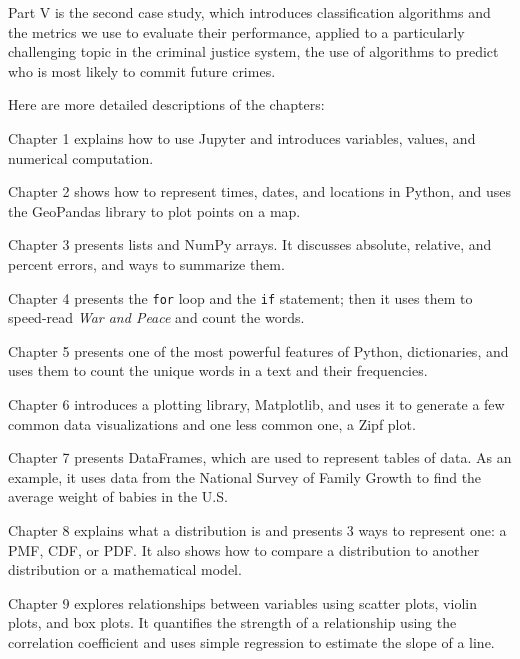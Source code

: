 Part V is the second case study, which introduces classification algorithms and the metrics we use to evaluate their performance, applied to a particularly challenging topic in the criminal justice system, the use of algorithms to predict who is most likely to commit future crimes.

Here are more detailed descriptions of the chapters:

\begin{description}

\item Chapter 1 explains how to use
Jupyter and introduces variables, values, and numerical computation.

\item Chapter 2 shows how to represent times,
dates, and locations in Python, and uses the GeoPandas library to plot
points on a map.

\item Chapter 3 presents lists and NumPy
arrays. It discusses absolute, relative, and percent errors, and ways to
summarize them.

\item Chapter 4 presents the \texttt{for} loop
and the \texttt{if} statement; then it uses them to speed-read \emph{War
and Peace} and count the words.

\item Chapter 5 presents one of the most powerful
features of Python, dictionaries, and uses them to count the unique
words in a text and their frequencies.

\item Chapter 6 introduces a plotting library,
Matplotlib, and uses it to generate a few common data visualizations and
one less common one, a Zipf plot.

\item Chapter 7 presents DataFrames, which are used
to represent tables of data. As an example, it uses data from the
National Survey of Family Growth to find the average weight of babies in
the U.S.

\item Chapter 8 explains what a distribution is
and presents 3 ways to represent one: a PMF, CDF, or PDF. It also shows
how to compare a distribution to another distribution or a mathematical
model.

\item Chapter 9 explores relationships between
variables using scatter plots, violin plots, and box plots. It
quantifies the strength of a relationship using the correlation
coefficient and uses simple regression to estimate the slope of a line.


\end{description}
